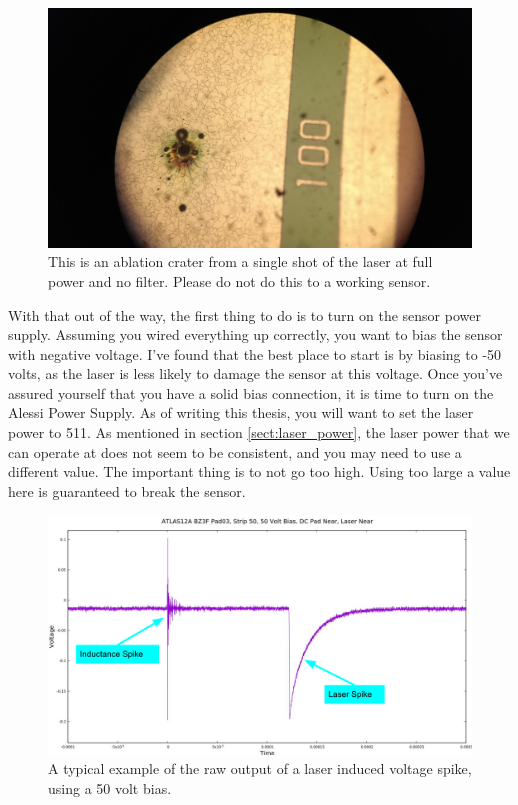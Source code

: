 \documentclass{report}
\begin{document}
            \begin{figure}[h] 
                \includegraphics[height=.4\textheight]{crater}
                \centering
                \caption{ This is an ablation crater from a single shot of the laser at full power and no filter. Please do not do this to a working sensor. }
                \label{fig:crater}
            \end{figure}

            With that out of the way, the first thing to do is to turn on the sensor power supply. Assuming you wired everything up correctly, you want to bias the sensor with negative voltage. I've found that the best place to start is by biasing to -50 volts, as the laser is less likely to damage the sensor at this voltage. Once you've assured yourself that you have a solid bias connection, it is time to turn on the Alessi Power Supply. As of writing this thesis, you will want to set the laser power to 511. As mentioned in section \ref{sect:laser_power}, the laser power that we can operate at does not seem to be consistent, and you may need to use a different value. The important thing is to not go too high. Using too large a value here is guaranteed to break the sensor.

            \begin{figure}[h] 
                \includegraphics[height=.4\textheight]{50V_spike}
                \centering
                \caption{ A typical example of the raw output of a laser induced voltage spike, using a 50 volt bias. }
                \label{fig:50V_spike}
            \end{figure}
\end{document}
